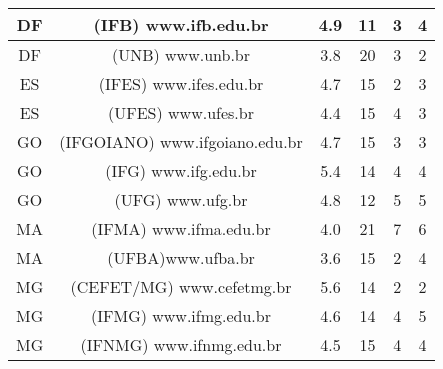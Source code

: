 \begin{center}
\begin{longtable}{|c|l|l|l|l|l|}
\hline
\multicolumn{1}{|c|}{DF} & \multicolumn{1}{c|}{(IFB) www.ifb.edu.br} & \multicolumn{1}{c|}{4.9} & \multicolumn{1}{c|}{11} & \multicolumn{1}{c|}{3} & \multicolumn{1}{c|}{4} \\ 
\hline
\multicolumn{1}{|c|}{DF} & \multicolumn{1}{c|}{(UNB) www.unb.br} & \multicolumn{1}{c|}{3.8} & \multicolumn{1}{c|}{20} & \multicolumn{1}{c|}{3} & \multicolumn{1}{c|}{2} \\ 
\hline
\multicolumn{1}{|c|}{ES} & \multicolumn{1}{c|}{(IFES) www.ifes.edu.br} & \multicolumn{1}{c|}{4.7} & \multicolumn{1}{c|}{15} & \multicolumn{1}{c|}{2} & \multicolumn{1}{c|}{3} \\ 
\hline
\multicolumn{1}{|c|}{ES} & \multicolumn{1}{c|}{(UFES) www.ufes.br} & \multicolumn{1}{c|}{4.4} & \multicolumn{1}{c|}{15} & \multicolumn{1}{c|}{4} & \multicolumn{1}{c|}{3} \\ 
\hline
\multicolumn{1}{|c|}{GO} & \multicolumn{1}{c|}{(IFGOIANO) www.ifgoiano.edu.br} & \multicolumn{1}{c|}{4.7} & \multicolumn{1}{c|}{15} & \multicolumn{1}{c|}{3} & \multicolumn{1}{c|}{3} \\ 
\hline
\multicolumn{1}{|c|}{GO} & \multicolumn{1}{c|}{(IFG) www.ifg.edu.br} & \multicolumn{1}{c|}{5.4} & \multicolumn{1}{c|}{14} & \multicolumn{1}{c|}{4} & \multicolumn{1}{c|}{4} \\ 
\hline
\multicolumn{1}{|c|}{GO} & \multicolumn{1}{c|}{(UFG) www.ufg.br} & \multicolumn{1}{c|}{4.8} & \multicolumn{1}{c|}{12} & \multicolumn{1}{c|}{5} & \multicolumn{1}{c|}{5} \\ 
\hline
\multicolumn{1}{|c|}{MA} & \multicolumn{1}{c|}{(IFMA) www.ifma.edu.br} & \multicolumn{1}{c|}{4.0} & \multicolumn{1}{c|}{21} & \multicolumn{1}{c|}{7} & \multicolumn{1}{c|}{6} \\ 
\hline
\multicolumn{1}{|c|}{MA} & \multicolumn{1}{c|}{(UFBA)www.ufba.br} & \multicolumn{1}{c|}{3.6} & \multicolumn{1}{c|}{15} & \multicolumn{1}{c|}{2} & \multicolumn{1}{c|}{4} \\ 
\hline
\multicolumn{1}{|c|}{MG} & \multicolumn{1}{c|}{(CEFET/MG) www.cefetmg.br} & \multicolumn{1}{c|}{5.6} & \multicolumn{1}{c|}{14} & \multicolumn{1}{c|}{2} & \multicolumn{1}{c|}{2} \\ 
\hline
\multicolumn{1}{|c|}{MG} & \multicolumn{1}{c|}{(IFMG) www.ifmg.edu.br} & \multicolumn{1}{c|}{4.6} & \multicolumn{1}{c|}{ 14} & \multicolumn{1}{c|}{4} & \multicolumn{1}{c|}{5} \\ 
\hline
\multicolumn{1}{|c|}{MG} & \multicolumn{1}{c|}{(IFNMG) www.ifnmg.edu.br} & \multicolumn{1}{c|}{4.5} & \multicolumn{1}{c|}{15} & \multicolumn{1}{c|}{4} & \multicolumn{1}{c|}{4} \\ 

\end{longtable}
\end{center}

